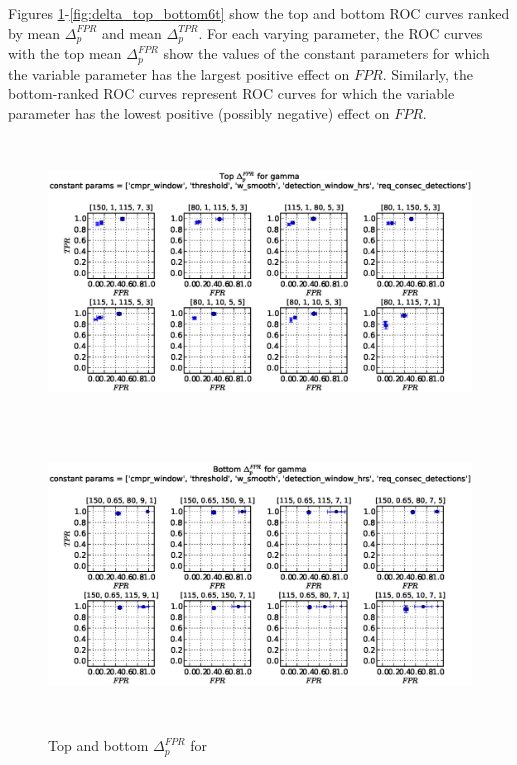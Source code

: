 \clearpage
Figures \ref{fig:delta_top_bottom1f}-\ref{fig:delta_top_bottom6t} show the top
and bottom ROC curves ranked by mean $\Delta_p^{FPR}$ and mean
$\Delta_p^{TPR}$. For each varying parameter, the ROC curves with the top mean
$\Delta_p^{FPR}$ show the values of the constant parameters for which the
variable parameter has the largest positive effect on $FPR$. Similarly, the
bottom-ranked ROC curves represent ROC curves for which the variable parameter
has the lowest positive (possibly negative) effect on $FPR$.

\begin{figure}[!h]
\begin{center}
\includegraphics[height=3in]{../fig/final/top_fpr/gamma}
\includegraphics[height=3in]{../fig/final/bottom_fpr/gamma}
\end{center}
\caption{\label{fig:delta_top_bottom1f} Top and bottom $\Delta_p^{FPR}$ for }
\end{figure}


